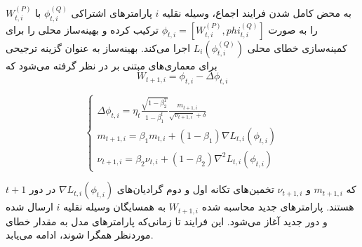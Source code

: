 به محض کامل شدن فرایند اجماع، وسیله نقلیه $i$ پارامترهای اشتراکی $\phi_{t,i}^{(Q)} $ با $W_{t,i}^{(P)} $ را به صورت $\phi_{t,i}=[W_{t,i}^{(P)}, phi_{t,i}^{(Q)}]$ ترکیب کرده و بهینه‌ساز محلی را برای کمینه‌سازی خطای محلی $L_i(\phi_{t,i}^{(Q)})$ اجرا می‌کند. بهینه‌ساز  به عنوان گزینه ترجیحی برای معماری‌های مبتنی بر  در نظر گرفته می‌شود که
\begin{equation}\label{e138}
	W_{t+1,i}=\phi_{t,i}-\Delta \phi_{t,i}
\end{equation}

\begin{equation}\label{e139}
	\begin{cases}
		\Delta\phi_{t,i}=\eta_t\frac{\sqrt{1-\beta_2^T}}{1-\beta_1^t}\frac{m_{t+1,i}}{\sqrt{\nu_{t+1,i}}+\delta}\\
		m_{t+1,i}=\beta_1 m_{t,i}+(1-\beta_1)\nabla L_{t,i}(\phi_{t,i})\\
		\nu_{t+1,i}=\beta_2\nu_{t,i}+(1-\beta_2)\nabla^2 L_{t,i}(\phi_{t,i})
	\end{cases}
\end{equation}

که $m_{t+1,i}$ و $\nu_{t+1,i}$ تخمین‌های تکانه اول و دوم گرادیان‌های $\nabla L_{t,i}(\phi_{t,i})$ در دور $t+1$ هستند. پارامترهای جدید محاسبه شده $W_{t+1,i}$ به همسایگان وسیله نقلیه $i$ ارسال شده و دور جدید آغاز می‌شود. این فرایند تا زمانی‌که پارامترهای مدل به مقدار خطای موردنظر همگرا شوند، ادامه می‌یابد. 